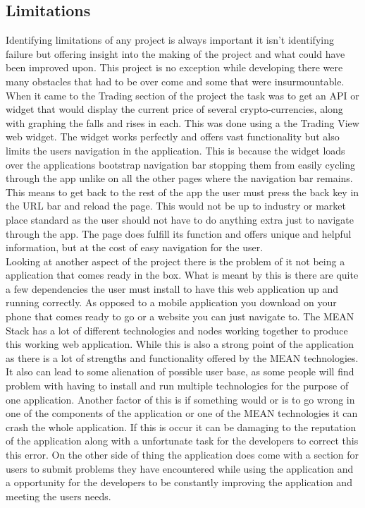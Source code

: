 \subsection{Limitations}
Identifying limitations of any project is always important it isn't identifying failure but offering insight into the making of the project and what could have been improved upon. This project is no exception while developing there were many obstacles that had to be over come and some that were insurmountable. When it came to the Trading section of the project the task was to get an API or widget that would display the current price of several crypto-currencies, along with graphing the falls and rises in each. This was done using a the Trading View web widget. The widget works perfectly and offers vast functionality but also limits the users navigation in the application. This is because the widget loads over the applications bootstrap navigation bar stopping them from easily cycling through the app unlike on all the other pages where the navigation bar remains. This means to get back to the rest of the app the user must press the back key in the URL bar and reload the page. This would not be up to industry or market place standard as the user should not have to do anything extra just to navigate through the app. The page does fulfill its function and offers unique and helpful information, but at the cost of easy navigation for the user. \\
Looking at another aspect of the project there is the problem of it not being a application that comes ready in the box. What is meant by this is there are quite a few dependencies the user must install to have this web application up and running correctly. As opposed to a mobile application you download on your phone that comes ready to go or a website you can just navigate to. The MEAN Stack has a lot of different technologies and nodes working together to produce this working web application. While this is also a strong point of the application as there is a lot of strengths and functionality offered by the MEAN technologies. It also can lead to some alienation of possible user base, as some people will find problem with having to install and run multiple technologies for the purpose of one application. Another factor of this is if something would or is to go wrong in one of the components of the application or one of the MEAN technologies it can crash the whole application. If this is occur it can be damaging to the reputation of the application along with a unfortunate task for the developers to correct this this error. On the other side of thing the application does come with a section for users to submit problems they have encountered while using the application and a opportunity for the developers to be constantly improving the application and meeting the users needs.

